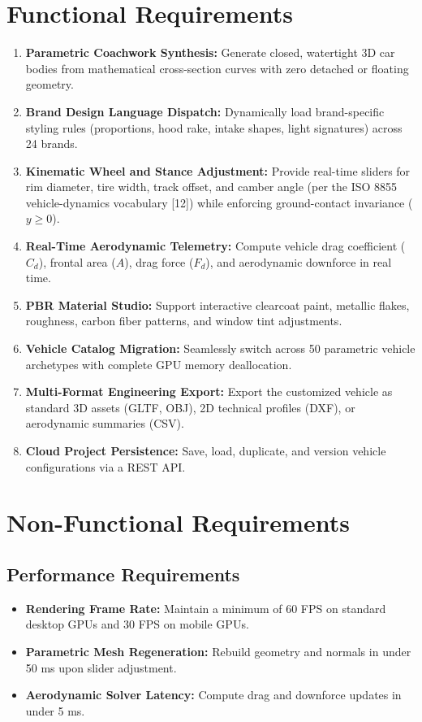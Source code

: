 \documentclass[12pt,a4paper]{report}
\begin{document}
\section{Functional Requirements}
\begin{enumerate}
    \item \textbf{Parametric Coachwork Synthesis:} Generate closed, watertight 3D car bodies from mathematical cross-section curves with zero detached or floating geometry.
    \item \textbf{Brand Design Language Dispatch:} Dynamically load brand-specific styling rules (proportions, hood rake, intake shapes, light signatures) across 24 brands.
    \item \textbf{Kinematic Wheel and Stance Adjustment:} Provide real-time sliders for rim diameter, tire width, track offset, and camber angle (per the ISO 8855 vehicle-dynamics vocabulary [12]) while enforcing ground-contact invariance ($y \ge 0$).
    \item \textbf{Real-Time Aerodynamic Telemetry:} Compute vehicle drag coefficient ($C_d$), frontal area ($A$), drag force ($F_d$), and aerodynamic downforce in real time.
    \item \textbf{PBR Material Studio:} Support interactive clearcoat paint, metallic flakes, roughness, carbon fiber patterns, and window tint adjustments.
    \item \textbf{Vehicle Catalog Migration:} Seamlessly switch across 50 parametric vehicle archetypes with complete GPU memory deallocation.
    \item \textbf{Multi-Format Engineering Export:} Export the customized vehicle as standard 3D assets (GLTF, OBJ), 2D technical profiles (DXF), or aerodynamic summaries (CSV).
    \item \textbf{Cloud Project Persistence:} Save, load, duplicate, and version vehicle configurations via a REST API.
\end{enumerate}

\section{Non-Functional Requirements}

\subsection{Performance Requirements}
\begin{itemize}
    \item \textbf{Rendering Frame Rate:} Maintain a minimum of 60 FPS on standard desktop GPUs and 30 FPS on mobile GPUs.
    \item \textbf{Parametric Mesh Regeneration:} Rebuild geometry and normals in under 50 ms upon slider adjustment.
    \item \textbf{Aerodynamic Solver Latency:} Compute drag and downforce updates in under 5 ms.
\end{itemize}
\end{document}
